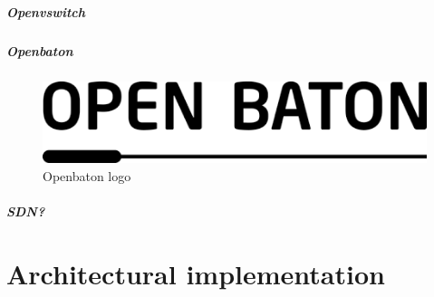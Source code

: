 \documentclass[10pt]{book}
\begin{document}
\paragraph{Openvswitch}
\paragraph{Openbaton}
\begin{figure}[h]
 \centering
 \includegraphics[scale=0.45]{openbaton_logo}
 \caption{Openbaton logo}
 \label{chap:prjan:img:openbaton_logo}
\end{figure}

\paragraph{SDN?}

\chapter{Architectural implementation}
\label{chap:archimpl}
\end{document}
